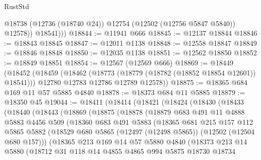 \begin{lexlean}{RustStd}
\begin{coremodule}
              @18738
              (@12736 (@18740 @24))
              @12754
              (@12502 (@12756 @5847 @5840))
              @12578))
          @18541)))
@18844 := @11941 @666
@18845 := @12137 @18844
@18846 := @18843 @18845
@18847 := @12011 @1138
@18848 := @12558 @18847
@18849 := @18846 @18848
@18850 := @12035 @1138
@18851 := @12562 @18850
@18852 := @18849 @18851
@18854 := @12567 (@12569 @666)
@18869 := @18449
    (@18452
      (@18459
        (@18462 (@18773 (@18779 (@18782 (@18852 @18854 @12601)) @18541)))
        @12780
        @12783
        @12786
        @12789
        @12578))
@18875 := @18365 @684 @169 @11 @57 @5885 @4840
@18878 := @18373 @684 @11 @5885
@18879 := @18350 @45
@19044 := @18411
    (@18414
      (@18421
        (@18424
          (@18430
            (@18433
              (@18440
                (@18443
                  (@18869
                    (@18875
                      (@18878
                        (@18879
                          @683
                          @491
                          @11
                          @4888
                          @5883
                          @4456
                          @509
                          (@18360
                            @683
                            @491
                            @5883
                            (@18365
                              @681
                              @215
                              @157
                              @112
                              @5865
                              @5882
                              (@18529
                                @680
                                @5865
                                (@12497 (@12498 @5865))
                                (@12502 (@12504 @680 @157)))
                              (@18365
                                @213
                                @169
                                @14
                                @57
                                @5880
                                @4840
                                (@18373
                                  @213
                                  @14
                                  @5880
                                  (@18712
                                    @31
                                    @118
                                    @14
                                    @4855
                                    @4865
                                    @994
                                    @5875
                                    @18730
                                    @18734

\end{coremodule}
\end{lexlean}
